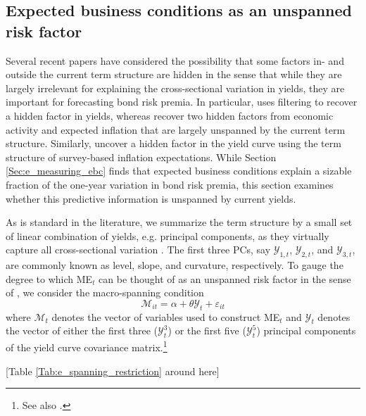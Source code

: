 \documentclass[12pt,letterpaper,leqno,doublespacing]{article}
\begin{document}
\subsection{Expected business conditions as an unspanned risk factor}\label{Sec:e_spanning_restriction}
Several recent papers have considered the possibility that some factors in- and outside the current term structure are hidden in the sense that while they are largely irrelevant for explaining the cross-sectional variation in yields, they are important for forecasting bond risk premia. In particular, \cite{Duffee2011} uses filtering to recover a hidden factor in yields, whereas \cite{JoslinPriebschSingleton2014} recover two hidden factors from economic activity and expected inflation that are largely unspanned by the current term structure. Similarly, \cite{ChernovMueller2012} uncover a hidden factor in the yield curve using the term structure of survey-based inflation expectations. While Section \ref{Sec:e_measuring_ebc} finds that expected business conditions explain a sizable fraction of the one-year variation in bond risk premia, this section examines whether this predictive information is unspanned by current yields.  

As is standard in the literature, we summarize the term structure by a small set of linear combination of yields, e.g. principal components, as they virtually capture all cross-sectional variation \citep{LittermanScheinkman1991}. The first three PCs, say $\mathcal{Y}_{1,t}$, $\mathcal{Y}_{2,t}$, and $\mathcal{Y}_{3,t}$, are commonly known as level, slope, and curvature, respectively. To gauge the degree to which ME$_{t}$ can be thought of as an unspanned risk factor in the sense of \cite{JoslinPriebschSingleton2014}, we consider the macro-spanning condition
\begin{equation}
    \mathcal{M}_{it} = \alpha + \theta\mathcal{Y}_{t} + \varepsilon_{it}
    \label{eq:e_macro_spanning_condition}
\end{equation}
where $\mathcal{M}_{t}$ denotes the vector of variables used to construct ME$_{t}$ and $\mathcal{Y}_{t}$ denotes the vector of either the first three ($\mathcal{Y}_{t}^{3}$) or the first five ($\mathcal{Y}_{t}^{5}$) principal components of the yield curve covariance matrix.\footnote{See also \cite{AndersenBenzoni2010}.}

\begin{center}
    [Table \ref{Tab:e_spanning_restriction} around here]
\end{center}
\end{document}
